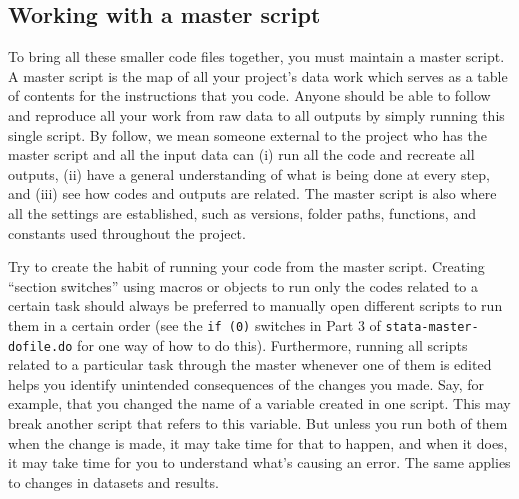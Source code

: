 \subsection{Working with a master script}
To bring all these smaller code files together, you must maintain a master script.
A master script is the map of all your project's data work
which serves as a table of contents for the instructions that you code.
Anyone should be able to follow and reproduce all your work from
raw data to all outputs by simply running this single script.
By follow, we mean someone external to the project who has the master script and all the input data can
(i) run all the code and recreate all outputs,
(ii) have a general understanding of what is being done at every step, and
(iii) see how codes and outputs are related.
The master script is also where all the settings are established,
such as versions, folder paths, functions, and constants used throughout the project.

Try to create the habit of running your code from the master script.
Creating ``section switches'' using macros or objects to run only the codes related to a certain task
should always be preferred to manually open different scripts to run them in a certain order
(see the \texttt{if (0)} switches in Part 3 of \texttt{stata-master-dofile.do} for one way of how to do this).
Furthermore, running all scripts related to a particular task through the master whenever one of them is edited
helps you identify unintended consequences of the changes you made.
Say, for example, that you changed the name of a variable created in one script.
This may break another script that refers to this variable.
But unless you run both of them when the change is made, it may take time for that to happen,
and when it does, it may take time for you to understand what's causing an error.
The same applies to changes in datasets and results.

